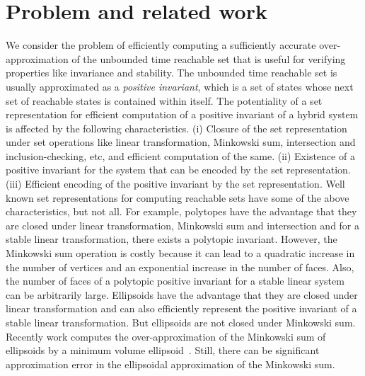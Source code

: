 \documentclass[11pt,a4paper,twoside,openright]{article}
\begin{document}
\section{Problem and related work}
We consider the problem of efficiently computing a sufficiently
accurate over-approximation of the unbounded time reachable set that
is useful for verifying properties like invariance and stability.  The
unbounded time reachable set is usually approximated as a {\it
  positive invariant}, which is a set of states whose next set of
reachable states is contained within itself.  The potentiality of a
set representation for efficient computation of a positive invariant
of a hybrid system is affected by the following characteristics.  (i)
Closure of the set representation under set operations like linear
transformation, Minkowski sum, intersection and inclusion-checking,
etc, and efficient computation of the same.  (ii) Existence of a
positive invariant for the system that can be encoded by the set
representation. (iii) Efficient encoding of the positive invariant by
the set representation.  Well known set representations for computing
reachable sets have some of the above characteristics, but not all.
For example, polytopes have the advantage that they are closed under
linear transformation, Minkowski sum and intersection and for a stable
linear transformation, there exists a polytopic invariant.  However,
the Minkowski sum operation is costly because it can lead to a
quadratic increase in the number of vertices and an exponential
increase in the number of faces.  Also, the number of faces of a
polytopic positive invariant for a stable linear system can be
arbitrarily large.  Ellipsoids have the advantage that they are closed
under linear transformation and can also efficiently represent the
positive invariant of a stable linear transformation.  But ellipsoids
are not closed under Minkowski sum.  Recently work computes the
over-approximation of the Minkowski sum of ellipsoids by a minimum
volume ellipsoid~\cite{}.  Still, there can be significant
approximation error in the ellipsoidal approximation of the Minkowski
sum.
\end{document}
